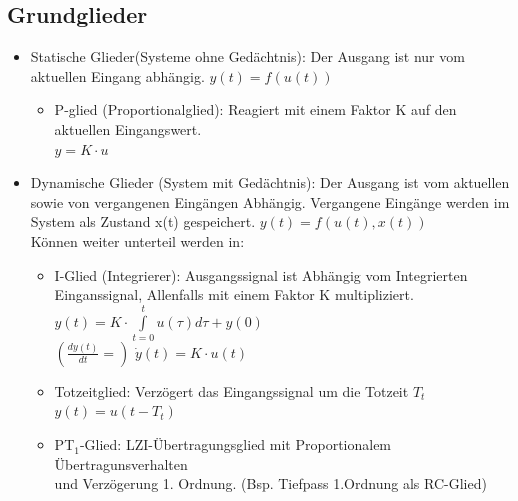 \documentclass[margin=normal]{tex/hsrzf}
\begin{document}
\subsection{Grundglieder}
\label{Grundglieder}
\begin{itemize}
      \item Statische Glieder(Systeme ohne Gedächtnis):
            Der Ausgang ist nur vom aktuellen Eingang abhängig.
            $y(t)=f(u(t))$
            \begin{itemize}
                  \item P-glied (Proportionalglied): Reagiert mit einem Faktor K auf den aktuellen Eingangswert.\\
                        $y = K \cdot u$
            \end{itemize}
      \item Dynamische Glieder (System mit Gedächtnis):
            Der Ausgang ist vom aktuellen sowie von vergangenen Eingängen Abhängig.
            Vergangene Eingänge werden im System als Zustand x(t) gespeichert.
            $y(t)=f(u(t),x(t))$ \\Können weiter unterteil werden in:
            \begin{itemize}
                  \item I-Glied (Integrierer):
                        Ausgangssignal ist Abhängig vom Integrierten Einganssignal, Allenfalls mit einem Faktor K multipliziert. \\
                        $y(t) = K \cdot \int \limits _{t=0} ^{t} u(\tau) d\tau + y(0)$ \\
                        $(\frac{dy(t)}{dt} =)$ \space $\dot{y}(t) = K \cdot u(t) $
                  \item Totzeitglied: Verzögert das Eingangssignal um die Totzeit $T_t$\\
                        $y(t) = u(t-T_t)$
                  \item PT$_1$-Glied:
                        LZI-Übertragungsglied mit Proportionalem Übertragunsverhalten \\
                        und Verzögerung 1. Ordnung. (Bsp. Tiefpass 1.Ordnung als RC-Glied)


\end{itemize}
\end{itemize}
\end{document}
